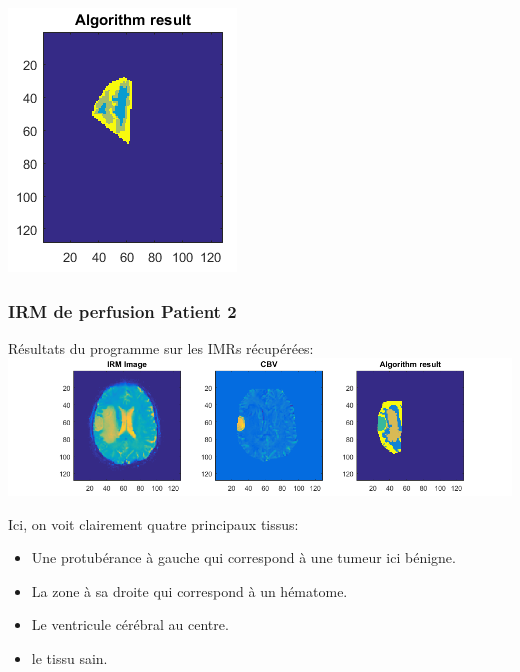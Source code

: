 \documentclass{beamer}
\begin{document}
\begin{frame}
\centering
\includegraphics[scale=0.80]{Patient2Result-ALGO.png}

\end{frame}


\begin{frame}
\frametitle{IRM de perfusion Patient 2}


\end{frame}

\begin{frame}

Résultats du programme sur les IMRs récupérées:
\includegraphics[scale=0.40]{Patient4Result.png}

Ici, on voit clairement quatre principaux tissus:
\begin{itemize}
\item Une protubérance à gauche qui correspond à une tumeur ici bénigne.
\item La zone à sa droite qui correspond à un hématome.
\item Le ventricule cérébral au centre.
\item le tissu sain.
\end{itemize}
\end{frame}
\end{document}
